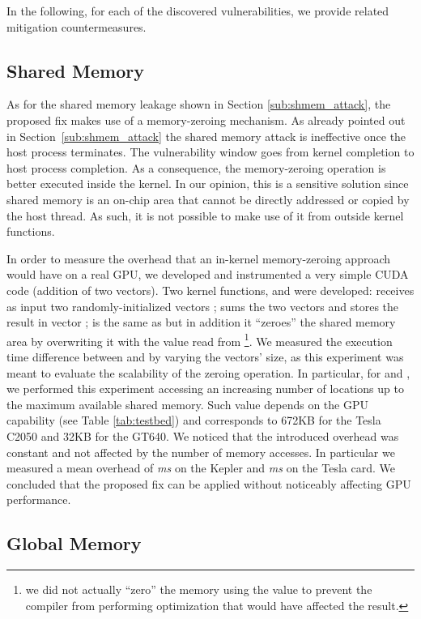 \documentclass[11pt,onecolumn,letterpaper]{IEEEtran}
\begin{document}
In the following, for each of the discovered vulnerabilities, we provide related mitigation countermeasures.
\subsection{Shared Memory}
As for  the shared memory leakage shown in Section \ref{sub:shmem_attack}, the proposed fix makes use of a memory-zeroing mechanism.
As already pointed out in Section~\ref{sub:shmem_attack} the shared memory attack is ineffective once the host process terminates.
The vulnerability window goes from kernel completion to host process completion.
As a consequence, the memory-zeroing operation is better executed inside the kernel.
In our opinion, this is a sensitive solution since shared memory is an on-chip area that cannot be directly addressed or copied by the host thread.
As such, it is not possible to make use of it from outside kernel functions.

\label{zeroingvector} 
In order to measure the overhead that an in-kernel memory-zeroing approach would have on a real GPU,
we developed and instrumented a very simple CUDA code (addition of two vectors).
Two kernel functions,  and  were developed:
 receives as input two randomly-initialized vectors ;
 sums the two vectors and stores the result in vector ;
 is the same as  but in addition it ``zeroes'' the shared memory area by overwriting it
with the value read from \footnote{we did not actually ``zero'' the memory using the value 
to prevent the compiler from performing optimization that would have affected the result.}. 
We measured the execution time difference between  and  by varying the vectors' size,
as this experiment was meant to evaluate the scalability of the zeroing operation. 
In particular, for  and , we performed this experiment accessing an increasing number of locations up to the maximum available shared memory.
Such value depends on the GPU capability (see Table \ref{tab:testbed}) and corresponds to 672KB for the Tesla C2050 and 32KB for the GT640.
We noticed that the introduced overhead was constant and not affected by the number of memory accesses.
In particular we 
measured a mean overhead of  \emph{ms} on the Kepler
and  \emph{ms} on the Tesla card.
We concluded that the proposed fix can be applied without noticeably affecting GPU performance.



\subsection{Global Memory}
\end{document}
